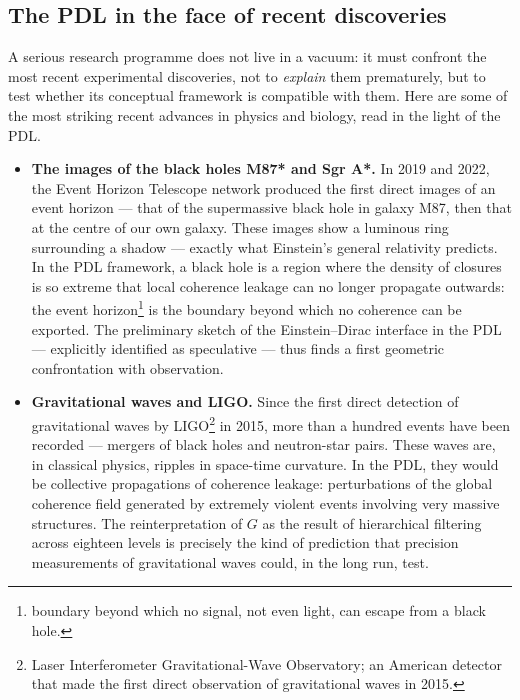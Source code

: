 \documentclass[11pt, a4paper, openright]{book}
\begin{document}
\subsection*{The PDL in the face of recent discoveries}

A serious research programme does not live in a vacuum: it must confront the most recent experimental discoveries, not to \emph{explain} them prematurely, but to test whether its conceptual framework is compatible with them. Here are some of the most striking recent advances in physics and biology, read in the light of the PDL.

\begin{itemize}

\item \textbf{The images of the black holes M87* and Sgr A*.} In 2019 and 2022, the Event Horizon Telescope network produced the first direct images of an event horizon — that of the supermassive black hole in galaxy M87, then that at the centre of our own galaxy. These images show a luminous ring surrounding a shadow — exactly what Einstein’s general relativity predicts. In the PDL framework, a black hole is a region where the density of closures is so extreme that local coherence leakage can no longer propagate outwards: the event horizon\footnote{boundary beyond which no signal, not even light, can escape from a black hole.} is the boundary beyond which no coherence can be exported. The preliminary sketch of the Einstein–Dirac interface in the PDL — explicitly identified as speculative — thus finds a first geometric confrontation with observation.

\item \textbf{Gravitational waves and LIGO.} Since the first direct detection of gravitational waves by LIGO\footnote{Laser Interferometer Gravitational-Wave Observatory; an American detector that made the first direct observation of gravitational waves in 2015.} in 2015, more than a hundred events have been recorded — mergers of black holes and neutron-star pairs. These waves are, in classical physics, ripples in space-time curvature. In the PDL, they would be collective propagations of coherence leakage: perturbations of the global coherence field generated by extremely violent events involving very massive structures. The reinterpretation of $G$ as the result of hierarchical filtering across eighteen levels is precisely the kind of prediction that precision measurements of gravitational waves could, in the long run, test.


\end{itemize}
\end{document}
